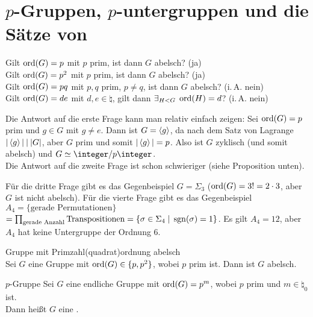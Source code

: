 \section{%
    \texorpdfstring{$p$}{p}-Gruppen, \texorpdfstring{$p$}{p}-untergruppen und
    die Sätze von %
}

\begin{Bem}
    Gilt $\operatorname{ord}(G) = p$ mit $p$ prim, ist dann $G$ abelsch? (ja)\\
    Gilt $\operatorname{ord}(G) = p^2$ mit $p$ prim, ist dann $G$ abelsch? (ja)\\
    Gilt $\operatorname{ord}(G) = pq$ mit $p, q$ prim, $p \not= q$, ist dann
    $G$ abelsch? (i.\,A. nein)\\
    Gilt $\operatorname{ord}(G) = de$ mit $d, e \in \natural$, gilt dann
    $\exists_{H < G}\; \operatorname{ord}(H) = d$? (i.\,A. nein)
\end{Bem}

\begin{Bem}
    Die Antwort auf die erste Frage kann man relativ einfach zeigen:
    Sei $\operatorname{ord}(G) = p$ prim und $g \in G$ mit $g \not= e$.
    Dann ist $G = \left\langle g\right\rangle$, da nach dem Satz von Lagrange
    $|\left\langle g\right\rangle| \mathbin{|} |G|$, aber $G$ prim und somit $|\left\langle g\right\rangle| = p$.
    Also ist $G$ zyklisch (und somit abelsch) und
    $G \simeq \integer/p\integer$.\\
    Die Antwort auf die zweite Frage ist schon schwieriger
    (siehe Proposition unten).
\end{Bem}

\begin{Bsp}
    Für die dritte Frage gibt es das Gegenbeispiel
    $G = \Sigma_3$ ($\operatorname{ord}(G) = 3! = 2 \cdot 3$, aber $G$ ist nicht abelsch).
    Für die vierte Frage gibt es das Gegenbeispiel
    $A_4 = \{\text{gerade Permutationen}\}$\\
    $= \prod_{\text{gerade Anzahl}} \text{Transpositionen}
    = \{\sigma \in \Sigma_4 \;|\; \operatorname{sgn}(\sigma) = 1\}$.
    Es gilt $A_4 = 12$, aber $A_4$ hat keine Untergruppe der Ordnung $6$.
\end{Bsp}

\begin{Prop}{Gruppe mit Primzahl(quadrat)ordnung abelsch}\\
    Sei $G$ eine Gruppe mit $\operatorname{ord}(G) \in \{p, p^2\}$, wobei $p$ prim ist.
    Dann ist $G$ abelsch.
\end{Prop}

\linie

\begin{Def}{$p$-Gruppe}
    Sei $G$ eine endliche Gruppe mit $\operatorname{ord}(G) = p^m$, wobei $p$ prim und
    $m \in \natural_0$ ist.\\
    Dann heißt $G$ eine .
\end{Def}

